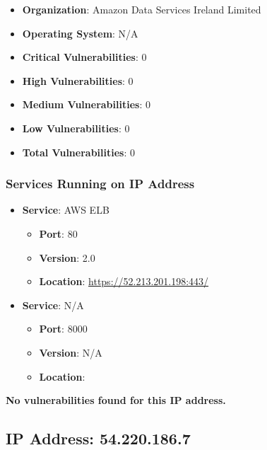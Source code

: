 \documentclass{article}
\begin{document}
\begin{itemize}
    \item \textbf{Organization}: Amazon Data Services Ireland Limited
    \item \textbf{Operating System}:  N/A 
    \item \textbf{Critical Vulnerabilities}: 0
    \item \textbf{High Vulnerabilities}: 0
    \item \textbf{Medium Vulnerabilities}: 0
    \item \textbf{Low Vulnerabilities}: 0
    \item \textbf{Total Vulnerabilities}: 0
\end{itemize}

\subsubsection*{Services Running on IP Address}

\begin{itemize}
    
        \item \textbf{Service}: AWS ELB
        \begin{itemize}
            \item \textbf{Port}: 80
            \item \textbf{Version}:  2.0 
            \item \textbf{Location}: \href{ https://52.213.201.198:443/ }{ https://52.213.201.198:443/ }
        \end{itemize}
    
        \item \textbf{Service}: N/A
        \begin{itemize}
            \item \textbf{Port}: 8000
            \item \textbf{Version}:  N/A 
            \item \textbf{Location}: \href{  }{  }
        \end{itemize}
    
\end{itemize}


\textbf{No vulnerabilities found for this IP address.}




\clearpage



\subsection{IP Address: 54.220.186.7}
\end{document}
